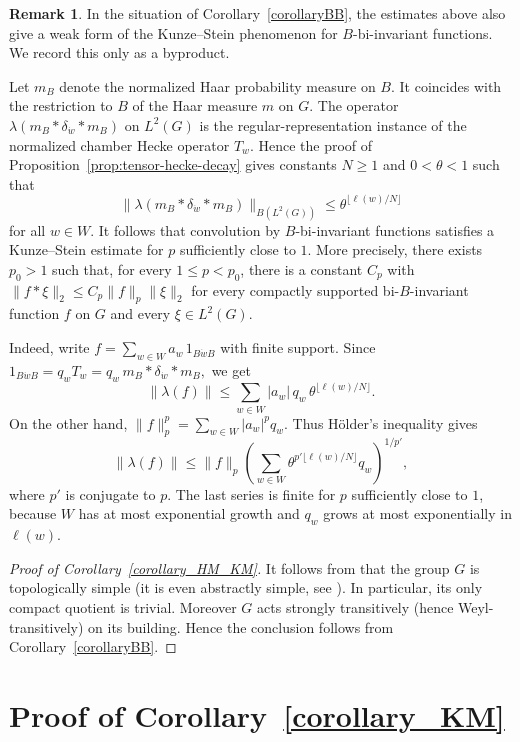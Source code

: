 \documentclass[12pt,a4paper]{amsproc}
\theoremstyle{definition}
\newtheorem{remark}[theorem]{Remark}
\begin{document}
\begin{remark}
  \label{rem:Kunze-Stein}
In the situation of Corollary~\ref{corollaryBB}, the estimates above also give a weak form of the Kunze--Stein phenomenon for $B$-bi-invariant functions. We record this only as a byproduct. 

Let \(m_B\) denote the normalized Haar probability measure on \(B\). It coincides with the restriction to $B$ of the Haar measure $m$ on $G$. The operator
$
\lambda(m_B*\delta_{\dot w}*m_B)
$
on \(L^2(G)\) is the regular-representation instance of the normalized
chamber Hecke operator \(T_w\). Hence the proof of Proposition~\ref{prop:tensor-hecke-decay}
gives constants \(N\geq 1\) and \(0<\theta<1\) such that
\[
\bigl\|\lambda(m_B*\delta_{\dot w}*m_B)\bigr\|_{B(L^2(G))}
\leq
\theta^{\lfloor \ell(w)/N\rfloor}
\]
for all \(w\in W\).
It follows that convolution by \(B\)-bi-invariant functions satisfies a
Kunze--Stein estimate for \(p\) sufficiently close to \(1\). More precisely,
there exists \(p_0>1\) such that, for every \(1\leq p<p_0\), there is a
constant \(C_p\) with
$
\|f*\xi\|_2\leq C_p\|f\|_p\|\xi\|_2
$
for every compactly supported bi-\(B\)-invariant function \(f\) on \(G\) and
every \(\xi\in L^2(G)\).

Indeed, write
$
f=\sum_{w\in W} a_w\,1_{B\dot wB}
$
with finite support. Since
$
1_{B\dot wB}=q_w T_w = q_w \,m_B*\delta_{\dot w}*m_B,
$
we get
\[
\|\lambda(f)\|
\leq
\sum_{w\in W}|a_w|\, q_w\,
\theta^{\lfloor \ell(w)/N\rfloor}.
\]
On the other hand,
$
\|f\|_p^p=\sum_{w\in W}|a_w|^p q_w.
$
Thus H\"older's inequality gives
\[
\|\lambda(f)\|
\leq
\|f\|_p
\left(
\sum_{w\in W}
\theta^{p'\lfloor \ell(w)/N\rfloor} q_w
\right)^{1/p'},
\]
where \(p'\) is conjugate to \(p\). The last series is finite for \(p\)
sufficiently close to \(1\), because \(W\) has at most exponential growth
and \(q_w\) grows at most exponentially in \(\ell(w)\).
\end{remark}

\begin{proof}[Proof of Corollary~\ref{corollary_HM_KM}]
It follows from \cite[Prop.~11 and Cor.~16]{CapRem} that the group $G$ is topologically simple (it is even abstractly simple, see \cite{Mar}). In particular, its only compact quotient is trivial. Moreover $G$ acts strongly transitively (hence Weyl-transitively) on its building. Hence the conclusion follows from Corollary~\ref{corollaryBB}. 
\end{proof}
	

\section{Proof of Corollary~\ref{corollary_KM}}
\end{document}
